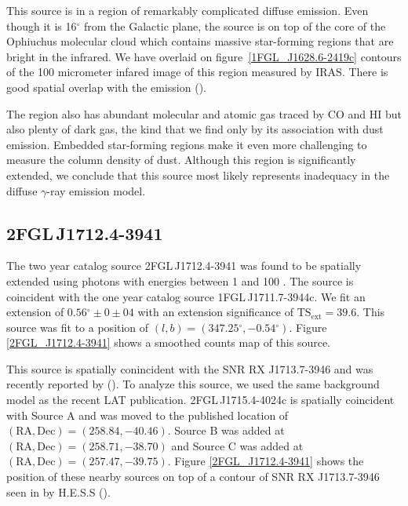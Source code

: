 \documentclass[12pt,preprint]{aastex}
\newcommand{\gev}{\text{GeV}\xspace}
\newcommand{\tev}{\text{TeV}\xspace}
\newcommand{\tsext}{{\ensuremath{\text{TS}_\text{ext}}}\xspace}
\renewcommand{\deg}{\ensuremath{^\circ}\xspace}
\begin{document}
This source is in a region of remarkably complicated diffuse emission.
Even though it is 16\deg from the Galactic plane, the source is on top
of the core of the Ophiuchus molecular cloud which contains massive
star-forming regions that are bright in the infrared.  We have overlaid
on figure~\ref{1FGL_J1628.6-2419c} contours of the 100 micrometer infared
image of this region measured by IRAS. There is good spatial overlap
with the \gev emission (\cite{iras_rho_ophiuci}).

The region also has abundant molecular and atomic gas traced by CO
and HI but also plenty of dark gas, the kind that we find only by its
association with dust emission. Embedded star-forming regions make it even
more challenging to measure the column density of dust.  Although this
region is significantly extended, we conclude that this source most
likely represents inadequacy in the diffuse $\gamma$-ray emission model.


\subsection{2FGL\,J1712.4-3941}
\label{section_2FGL_J1712.4-3941}


The two year catalog source 2FGL\,J1712.4-3941 was found to be
spatially extended using photons with energies between 1 \gev and
100 \gev. The source is coincident with the one year catalog source
1FGL\,J1711.7-3944c. We fit an extension of $0.56\deg\pm0\pm04$ with an
extension significance of $\tsext=39.6$. This source was fit to a position
of $(l,b)=(347.25\deg,-0.54\deg)$. Figure \ref{2FGL_J1712.4-3941} shows
a smoothed counts map of this source.

This source is spatially conincident with the SNR RX J1713.7-3946 and was
recently reported by (\cite{rx_j1713_lat}).  To analyze this source,
we used the same background model as the recent LAT publication.
2FGL\,J1715.4-4024c is spatially coincident with Source A and was
moved to the published location of 
$(\text{RA},\text{Dec})=(258.84,-40.46)$. Source
B was added at 
$(\text{RA},\text{Dec})=(258.71,-38.70)$ and Source C was added at
$(\text{RA},\text{Dec})=(257.47,-39.75)$.  Figure \ref{2FGL_J1712.4-3941} shows
the position of these nearby sources on top of a contour of SNR RX
J1713.7-3946 seen in \tev by H.E.S.S (\cite{rx_j1713_hess}).
\end{document}
